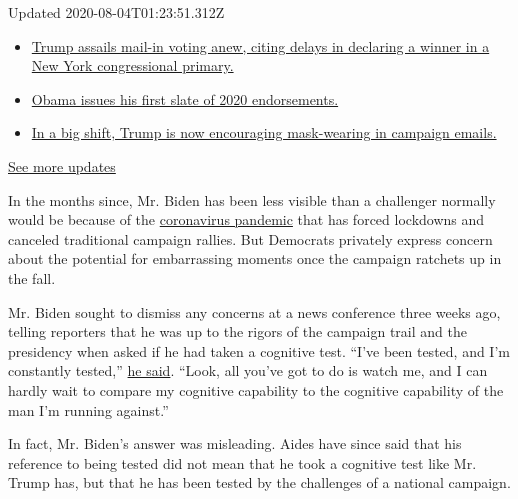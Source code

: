 Updated 2020-08-04T01:23:51.312Z

\begin{itemize}
\tightlist
\item
  \href{https://www.nytimes.com/2020/08/03/us/elections/biden-vs-trump.html?action=click\&pgtype=Article\&state=default\&region=MAIN_CONTENT_1\&context=storylines_live_updates\#link-6494b448}{Trump
  assails mail-in voting anew, citing delays in declaring a winner in a
  New York congressional primary.}
\item
  \href{https://www.nytimes.com/2020/08/03/us/elections/biden-vs-trump.html?action=click\&pgtype=Article\&state=default\&region=MAIN_CONTENT_1\&context=storylines_live_updates\#link-3de249e6}{Obama
  issues his first slate of 2020 endorsements.}
\item
  \href{https://www.nytimes.com/2020/08/03/us/elections/biden-vs-trump.html?action=click\&pgtype=Article\&state=default\&region=MAIN_CONTENT_1\&context=storylines_live_updates\#link-54e34d20}{In
  a big shift, Trump is now encouraging mask-wearing in campaign
  emails.}
\end{itemize}

\href{https://www.nytimes.com/2020/08/03/us/elections/biden-vs-trump.html?action=click\&pgtype=Article\&state=default\&region=MAIN_CONTENT_1\&context=storylines_live_updates}{See
more updates}

In the months since, Mr. Biden has been less visible than a challenger
normally would be because of the
\href{https://www.nytimes.com/interactive/2020/us/coronavirus-us-cases.html}{coronavirus
pandemic} that has forced lockdowns and canceled traditional campaign
rallies. But Democrats privately express concern about the potential for
embarrassing moments once the campaign ratchets up in the fall.

Mr. Biden sought to dismiss any concerns at a news conference three
weeks ago, telling reporters that he was up to the rigors of the
campaign trail and the presidency when asked if he had taken a cognitive
test. ``I've been tested, and I'm constantly tested,''
\href{https://www.foxnews.com/politics/biden-eager-to-compare-cognitive-ability-against-trumps}{he
said}. ``Look, all you've got to do is watch me, and I can hardly wait
to compare my cognitive capability to the cognitive capability of the
man I'm running against.''

In fact, Mr. Biden's answer was misleading. Aides have since said that
his reference to being tested did not mean that he took a cognitive test
like Mr. Trump has, but that he has been tested by the challenges of a
national campaign.

